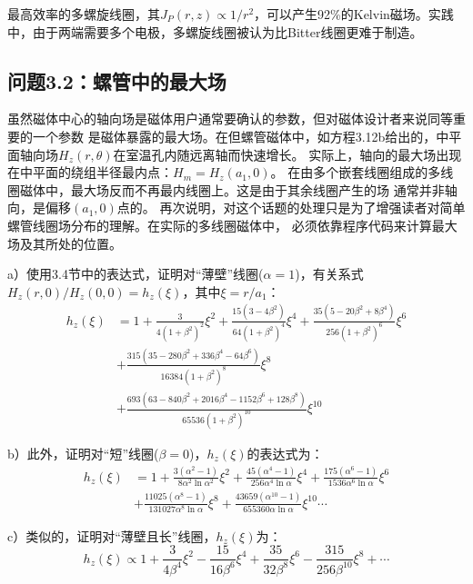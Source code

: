 最高效率的多螺旋线圈，其$J_P(r,z)\propto 1/r^2$，可以产生92\%的Kelvin磁场。实践中，由于两端需要多个电极，多螺旋线圈被认为比Bitter线圈更难于制造。
\newpage


\subsection{问题3.2：螺管中的最大场}
虽然磁体中心的轴向场是磁体用户通常要确认的参数，但对磁体设计者来说同等重要的一个参数
是磁体暴露的最大场。在但螺管磁体中，如方程3.12b给出的，中平面轴向场$H_z(r,
\theta)$在室温孔内随远离轴而快速增长。
实际上，轴向的最大场出现在中平面的绕组半径最内点：$H_m=H_z(a_1,0)$。
在由多个嵌套线圈组成的多线圈磁体中，最大场反而不再最内线圈上。这是由于其余线圈产生的场
通常并非轴向，是偏移$(a_1,0)$点的。
再次说明，对这个话题的处理只是为了增强读者对简单螺管线圈场分布的理解。在实际的多线圈磁体中，
必须依靠程序代码来计算最大场及其所处的位置。

a）使用3.4节中的表达式，证明对“薄壁”线圈($\alpha=1$)，有关系式$H_z(r,0)/H_z(0,0)=h_z(\xi)$，其中$\xi=r/a_1$：
\begin{equation}
\begin{split}
h_z(\xi)&=1+\frac{3}{4(1+\beta^2)^2}\xi^2+\frac{15(3-4\beta^2)}{64(1+\beta^2)^4}\xi^4+\frac{35(5-20\beta^2+8\beta^4)}{256(1+\beta^2)^6}\xi^6\\
&+\frac{315(35-280\beta^2+336\beta^4-64\beta^6)}{16384(1+\beta^2)^8}\xi^8\\
&+\frac{693(63-840\beta^2+2016\beta^4-1152\beta^6+128\beta^8)}{65536(1+\beta^2)^{10}}\xi^{10}%
\end{split}
\end{equation}

b）此外，证明对“短”线圈($\beta=0$)，$h_z(\xi)$的表达式为：
\begin{equation}
\begin{split}
h_z(\xi)&=1+\frac{3(\alpha^2-1)}{8\alpha^2\ln\alpha^2}\xi^2+\frac{45(\alpha^4-1)}{256\alpha^4\ln\alpha}\xi^4+\frac{175(\alpha^6-1)}{1536\alpha^6\ln\alpha}\xi^6\\
&+\frac{11025(\alpha^8-1)}{131027\alpha^8\ln\alpha}\xi^8+\frac{43659(\alpha^10-1)}{655360\alpha\ln\alpha}\xi^{10}\cdots%
\end{split}
\end{equation}

c）类似的，证明对“薄壁且长”线圈，$h_z(\xi)$为：
\begin{equation}
h_z(\xi)\propto1+\frac{3}{4\beta^4}\xi^2-\frac{15}{16\beta^6}\xi^4+\frac{35}{32\beta^8}\xi^6-\frac{315}{256\beta^{10}}\xi^8+\cdots%
\end{equation}

